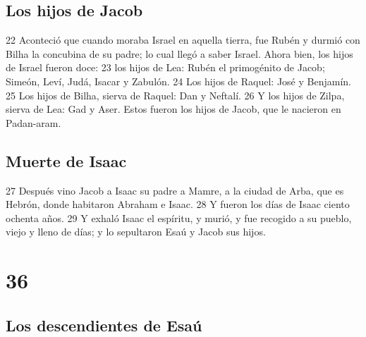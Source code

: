 \section{Los hijos de Jacob}

22 Aconteció que cuando moraba Israel en aquella tierra, fue Rubén y durmió con Bilha la concubina de su padre; lo cual llegó a saber Israel. Ahora bien, los hijos de Israel fueron doce:
23 los hijos de Lea: Rubén el primogénito de Jacob; Simeón, Leví, Judá, Isacar y Zabulón.
24 Los hijos de Raquel: José y Benjamín.
25 Los hijos de Bilha, sierva de Raquel: Dan y Neftalí.
26 Y los hijos de Zilpa, sierva de Lea: Gad y Aser. Estos fueron los hijos de Jacob, que le nacieron en Padan-aram.

\section{Muerte de Isaac}

27 Después vino Jacob a Isaac su padre a Mamre, a la ciudad de Arba, que es Hebrón, donde habitaron Abraham e Isaac.
28 Y fueron los días de Isaac ciento ochenta años.
29 Y exhaló Isaac el espíritu, y murió, y fue recogido a su pueblo, viejo y lleno de días; y lo sepultaron Esaú y Jacob sus hijos.

\chapter{36}

\section{Los descendientes de Esaú}

